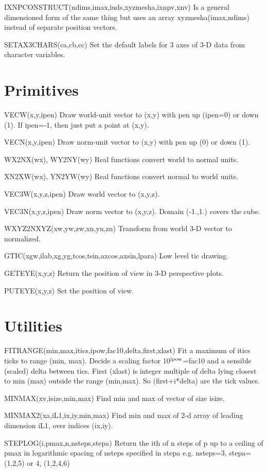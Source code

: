 \documentclass[12pt]{article}
\begin{document}
IXNPCONSTRUCT(ndims,imax,iuds,xyzmesha,ixnpv,xnv) Is a general
dimensioned form of the same thing but uses an array
xyzmesha(imax,ndims) instead of separate position vectors.

SETAX3CHARS(ca,cb,cc) Set the default labels for 3 axes of 3-D data
from character variables.

\section{Primitives}

VECW(x,y,ipen) Draw world-unit vector to (x,y) with pen up (ipen=0) or
down (1). If ipen=-1, then just put a point at (x,y).

VECN(x,y,ipen) Draw norm-unit vector to (x,y) with pen up (0) or down (1).

WX2NX(wx), WY2NY(wy) Real functions convert world to normal units.

XN2XW(wx), YN2YW(wy) Real functions convert normal to world units.

VEC3W(x,y,z,ipen) Draw world vector to (x,y,z).

VEC3N(x,y,z,ipen) Draw norm vector to (x,y,z). Domain (-1.,1.) covers
the cube.

WXYZ2NXYZ(xw,yw,zw,xn,yn,zn) Transform from world 3-D vector to
normalized.

GTIC(xgw,ilab,xg,yg,tcos,tsin,axcos,axsin,lpara) Low level tic drawing.

GETEYE(x,y,z) Return the position of view in 3-D perspective plots.

PUTEYE(x,y,z) Set the position of view.

\section{Utilities}

FITRANGE(min,max,itics,ipow,fac10,delta,first,xlast) Fit a maximum of
itics ticks to range (min, max). Decide a scaling factor 10$^{\rm
ipow}$=fac10 and a sensible (scaled) delta between tics. First (xlast)
is integer multiple of delta lying closest to min (max) outside the
range (min,max). So (first+i*delta) are the tick values.

MINMAX(xv,isize,min,max) Find min and max of vector of size isize.

MINMAX2(xa,iL1,ix,iy,min,max) Find min and max of 2-d array of
leading dimension iL1, over indices (ix,iy).

STEPLOG(i,pmax,n,nsteps,stepa) Return the ith of n steps of p up to a
ceiling of pmax in logarithmic spacing of nsteps specified in stepa
e.g. nsteps=3, stepa=(1,2,5) or 4, (1,2,4,6)
\end{document}
